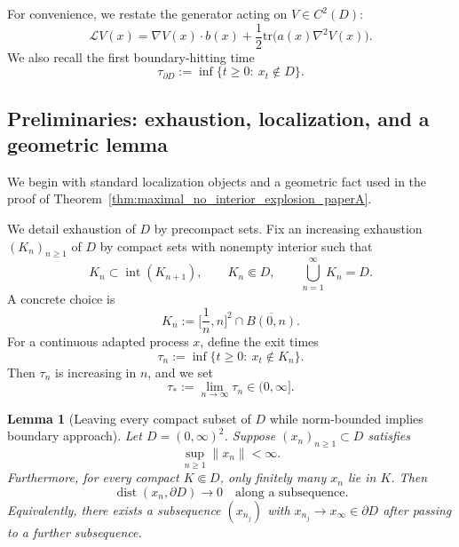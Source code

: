 \documentclass[pdflatex,sn-mathphys-ay]{sn-jnl}
\theoremstyle{thmstyleone}
\newtheorem{lemma}[theorem]{Lemma}
\theoremstyle{definition}
\theoremstyle{remark}
\begin{document}
\begin{appendices}
For convenience, we restate the generator acting on \(V\in C^2(D)\):
\begin{equation}
\label{eq:appC_generator}
\mathcal LV(x)=\nabla V(x)\cdot b(x)+\frac12\mathrm{tr}\!\big(a(x)\nabla^2V(x)\big).
\end{equation}
We also recall the first boundary-hitting time
\begin{equation}
\label{eq:appC_tau_boundary}
\tau_{\partial D}:=\inf\{t\ge 0:\ x_t\notin D\}.
\end{equation}

\subsection{Preliminaries: exhaustion, localization, and a geometric lemma}
\label{appC:preliminaries}

We begin with standard localization objects and a geometric fact used in the proof of Theorem~\ref{thm:maximal_no_interior_explosion_paperA}.

We detail exhaustion of \(D\) by precompact sets.
Fix an increasing exhaustion \((K_n)_{n\ge 1}\) of \(D\) by compact sets with nonempty interior such that
\begin{equation}
\label{eq:appC_exhaustion}
K_n\subset \operatorname{int}(K_{n+1}),\qquad K_n\Subset D,\qquad \bigcup_{n=1}^\infty K_n=D.
\end{equation}
A concrete choice is
\[
K_n:=\Big[\frac1n,n\Big]^2\cap \overline{B(0,n)}.
\]
For a continuous adapted process \(x\), define the exit times
\begin{equation}
\label{eq:appC_tau_n}
\tau_n:=\inf\{t\ge 0:\ x_t\notin K_n\}.
\end{equation}
Then \(\tau_n\) is increasing in \(n\), and we set
\begin{equation}
\label{eq:appC_tau_star_def}
\tau_*:=\lim_{n\to\infty}\tau_n\in(0,\infty].
\end{equation}

\begin{lemma}[Leaving every compact subset of \(D\) while norm-bounded implies boundary approach]
\label{lem:appC_boundary_approach}
Let \(D=(0,\infty)^2\). Suppose \((x_n)_{n\ge1}\subset D\) satisfies
\[
\sup_{n\ge1}\|x_n\|<\infty.
\]
Furthermore, for every compact $K\Subset D$, only finitely many $x_n$ lie in $K$. 
Then
\[
\operatorname{dist}(x_n,\partial D)\to 0
\quad\text{along a subsequence}.
\]
Equivalently, there exists a subsequence \((x_{n_j})\) with \(x_{n_j}\to x_\infty\in\partial D\) after passing to a further subsequence.
\end{lemma}


\end{appendices}
\end{document}

